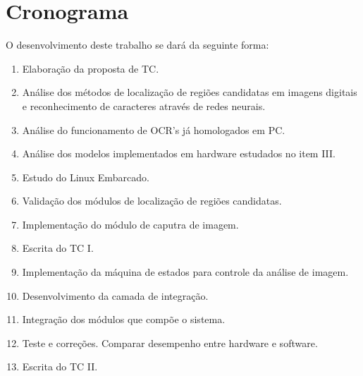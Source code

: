 \chapter{Cronograma}

O desenvolvimento deste trabalho se dará da seguinte forma:

\begin{enumerate}
	\item \label{ela-pro} Elaboração da proposta de TC.
	\item \label{anI} Análise dos métodos de localização de regiões candidatas em imagens digitais e
		reconhecimento de caracteres através de redes neurais.
	\item \label{anII} Análise do funcionamento de OCR's já homologados em PC.
	\item \label{anIII} Análise dos modelos implementados em hardware estudados no item III. 
	\item \label{dI} Estudo do Linux Embarcado.
	\item \label{dII}  Validação dos módulos de localização de regiões candidatas.
	\item \label{dIII} Implementação do módulo de caputra de imagem. 
	\item \label{esc-tcI}  Escrita do TC I.
	\item \label{imI} Implementação da máquina de estados para controle da análise de imagem.
	\item \label{imII} Desenvolvimento da camada de integração.
	\item \label{imIII} Integração dos módulos que compõe o sistema.
	\item \label{tec} Teste e correções.
		\subitem Comparar desempenho entre hardware e software.
	\item \label{esc-tcII} Escrita do TC II.
\end{enumerate}

